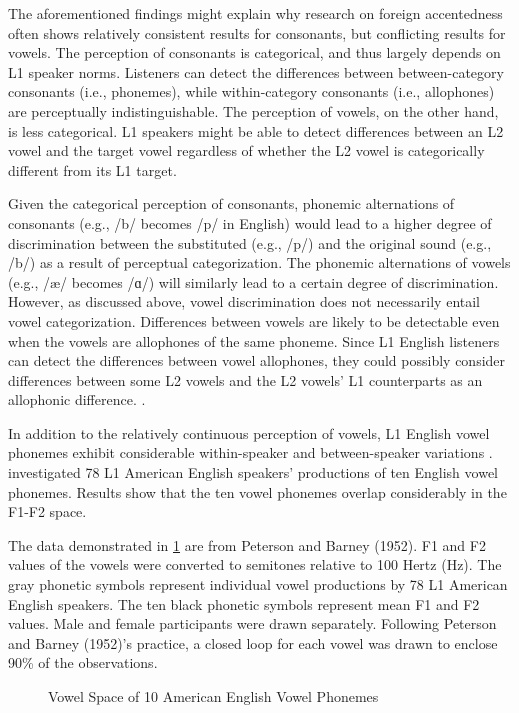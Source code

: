 The aforementioned findings might explain why research on foreign accentedness often shows relatively consistent results for consonants, but conflicting results for vowels. The perception of consonants is categorical, and thus largely depends on L1 speaker norms. Listeners can detect the differences between between-category consonants (i.e., phonemes), while within-category consonants (i.e., allophones) are perceptually indistinguishable. The perception of vowels, on the other hand, is less categorical. L1 speakers might be able to detect differences between an L2 vowel and the target vowel regardless of whether the L2 vowel is categorically different from its L1 target. 

Given the categorical perception of consonants, phonemic alternations of consonants (e.g., /b/ becomes /p/ in English) would lead to a higher degree of discrimination between the substituted (e.g., /p/) and the original sound (e.g., /b/) as a result of perceptual categorization. The phonemic alternations of vowels (e.g., /æ/ becomes /ɑ/) will similarly lead to a certain degree of discrimination. However, as discussed above, vowel discrimination does not necessarily entail vowel categorization. Differences between vowels are likely to be detectable even when the vowels are allophones of the same phoneme. Since L1 English listeners can detect the differences between vowel allophones, they could possibly consider differences between some L2 vowels and the L2 vowels’ L1 counterparts as an allophonic difference.    .

In addition to the relatively continuous perception of vowels, L1 English vowel phonemes exhibit considerable within-speaker and between-speaker variations \citep{Hillenbrand_1995, Peterson_1952}. \citet{Peterson_1952} investigated 78 L1 American English speakers’ productions of ten English vowel phonemes. Results show that the ten vowel phonemes overlap considerably in the F1-F2 space. 

The data demonstrated in \ref{fig:nativeVowel} are from Peterson and Barney (1952). F1 and F2 values of the vowels were converted to semitones relative to 100 Hertz (Hz). The gray phonetic symbols represent individual vowel productions by 78 L1 American English speakers. The ten black phonetic symbols represent mean F1 and F2 values. Male and female participants were drawn separately. Following Peterson and Barney (1952)’s practice, a closed loop for each vowel was drawn to enclose 90\% of the observations.

\begin{figure}
    \centering
    
    \caption{Vowel Space of 10 American English Vowel Phonemes}
    \label{fig:nativeVowel}
  \figSpace
\end{figure}

